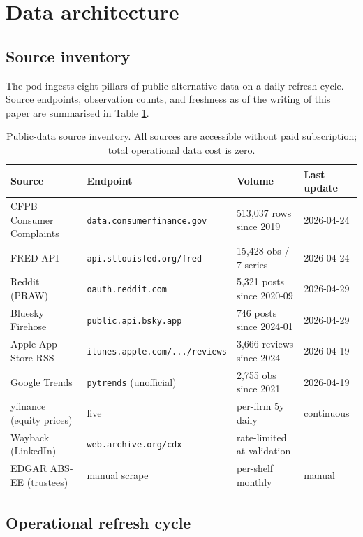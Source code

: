 \documentclass[11pt,a4paper]{article}
\begin{document}
\section{Data architecture}\label{sec:data}

\subsection{Source inventory}

The pod ingests eight pillars of public alternative data on a daily refresh cycle. Source endpoints, observation counts, and freshness as of the writing of this paper are summarised in Table \ref{tab:sources}.

\begin{table}[h]
\centering\footnotesize
\begin{tabular}{@{}p{4cm}p{4.5cm}p{3cm}p{2.5cm}@{}}
\toprule
\textbf{Source} & \textbf{Endpoint} & \textbf{Volume} & \textbf{Last update} \\
\midrule
CFPB Consumer Complaints & \texttt{data.consumerfinance.gov} & 513{,}037 rows since 2019 & 2026-04-24 \\
FRED API & \texttt{api.stlouisfed.org/fred} & 15{,}428 obs / 7 series & 2026-04-24 \\
Reddit (PRAW) & \texttt{oauth.reddit.com} & 5{,}321 posts since 2020-09 & 2026-04-29 \\
Bluesky Firehose & \texttt{public.api.bsky.app} & 746 posts since 2024-01 & 2026-04-29 \\
Apple App Store RSS & \texttt{itunes.apple.com/.../reviews} & 3{,}666 reviews since 2024 & 2026-04-19 \\
Google Trends & \texttt{pytrends} (unofficial) & 2{,}755 obs since 2021 & 2026-04-19 \\
yfinance (equity prices) & live & per-firm 5y daily & continuous \\
Wayback (LinkedIn) & \texttt{web.archive.org/cdx} & rate-limited at validation & --- \\
EDGAR ABS-EE (trustees) & manual scrape & per-shelf monthly & manual \\
\bottomrule
\end{tabular}
\caption{Public-data source inventory. All sources are accessible without paid subscription; total operational data cost is zero.}\label{tab:sources}
\end{table}

\subsection{Operational refresh cycle}
\end{document}
